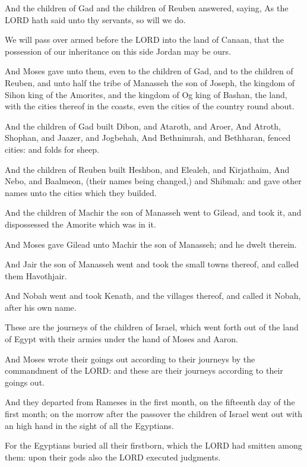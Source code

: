 \Verse And the children of Gad and the children of Reuben answered,
saying, As the LORD hath said unto thy servants, so will we do.

\Verse We will pass over armed before the LORD into the land of Canaan,
that the possession of our inheritance on this side Jordan may be
ours.

\Verse And Moses gave unto them, even to the children of Gad, and to
the children of Reuben, and unto half the tribe of Manasseh the son of
Joseph, the kingdom of Sihon king of the Amorites, and the kingdom of
Og king of Bashan, the land, with the cities thereof in the coasts,
even the cities of the country round about.

\Verse And the children of Gad built Dibon, and Ataroth, and Aroer,
\Verse And Atroth, Shophan, and Jaazer, and Jogbehah, \Verse And
Bethnimrah, and Bethharan, fenced cities: and folds for sheep.

\Verse And the children of Reuben built Heshbon, and Elealeh, and
Kirjathaim, \Verse And Nebo, and Baalmeon, (their names being changed,)
and Shibmah: and gave other names unto the cities which they builded.

\Verse And the children of Machir the son of Manasseh went to Gilead,
and took it, and dispossessed the Amorite which was in it.

\Verse And Moses gave Gilead unto Machir the son of Manasseh; and he
dwelt therein.

\Verse And Jair the son of Manasseh went and took the small towns
thereof, and called them Havothjair.

\Verse And Nobah went and took Kenath, and the villages thereof, and
called it Nobah, after his own name.


\Chapter
\Verse These are the journeys of the children of Israel, which went
forth out of the land of Egypt with their armies under the hand of
Moses and Aaron.

\Verse And Moses wrote their goings out according to their journeys by
the commandment of the LORD: and these are their journeys according to
their goings out.

\Verse And they departed from Rameses in the first month, on the
fifteenth day of the first month; on the morrow after the passover the
children of Israel went out with an high hand in the sight of all the
Egyptians.

\Verse For the Egyptians buried all their firstborn, which the LORD had
smitten among them: upon their gods also the LORD executed judgments.

